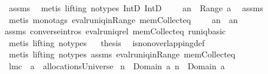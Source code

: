 \begin{isabellebody}
\ assms\ \isamarkupfalse%
\ {\isacharparenleft}metis\ {\isacharparenleft}lifting{\isacharcomma}\ no{\isacharunderscore}types{\isacharparenright}\ IntD{}\ IntD{}{\isacharparenright}\isanewline
{}\isamarkupfalse%
\ \isamarkupfalse%
\ \isamarkupfalse%
\ {\isachardoublequoteopen}a{\isacharcomma}{\isacharcomma}n{}\ {\isasymin}\ Range\ a{\isachardoublequoteclose}\ \isamarkupfalse%
\ assms\ \isanewline
{}\isamarkupfalse%
\ {\isacharparenleft}metis\ {\isacharparenleft}mono{\isacharunderscore}tags{\isacharparenright}\ eval{\isacharunderscore}runiq{\isacharunderscore}in{\isacharunderscore}Range\ mem{\isacharunderscore}Collect{\isacharunderscore}eq{\isacharparenright}\isanewline
{}\isamarkupfalse%
\ \isamarkupfalse%
\ \isamarkupfalse%
\ {\isachardoublequoteopen}a{\isacharcomma}{\isacharcomma}n{}\ {\isasymnoteq}\ a{\isacharcomma}{\isacharcomma}n{}{\isachardoublequoteclose}\ \isamarkupfalse%
\ \isanewline
assms\ converse{\isachardot}intros\ eval{\isacharunderscore}runiq{\isacharunderscore}rel\ mem{\isacharunderscore}Collect{\isacharunderscore}eq\ runiq{\isacharunderscore}basic\ \isamarkupfalse%
\ {\isacharparenleft}metis\ {\isacharparenleft}lifting{\isacharcomma}\ no{\isacharunderscore}types{\isacharparenright}{\isacharparenright}\isanewline
{}\isamarkupfalse%
\ \isamarkupfalse%
\ {\isacharquery}thesis\ \isamarkupfalse%
\ is{\isacharunderscore}non{\isacharunderscore}overlapping{\isacharunderscore}def\ \isamarkupfalse%
\ {\isacharparenleft}metis\ {\isacharparenleft}lifting{\isacharcomma}\ no{\isacharunderscore}types{\isacharparenright}\ assms{\isacharparenleft}{}{\isacharparenright}\ eval{\isacharunderscore}runiq{\isacharunderscore}in{\isacharunderscore}Range\ mem{\isacharunderscore}Collect{\isacharunderscore}eq{\isacharparenright}\isanewline
{}\isamarkupfalse%
%
\endisatagproof
{\isafoldproof}%
%
\isadelimproof
%
\endisadelimproof
\isanewline
\isanewline
{}\isamarkupfalse%
\ lm{}{}c{\isacharcolon}\ \ {\isachardoublequoteopen}a\ {\isasymin}\ allocationsUniverse{\isachardoublequoteclose}\ \isanewline
{\isachardoublequoteopen}n{}\ {\isasymin}\ Domain\ a{\isachardoublequoteclose}\ {\isachardoublequoteopen}n{}\ {\isasymin}\ Domain\ a{\isachardoublequoteclose}\isanewline

\end{isabellebody}
